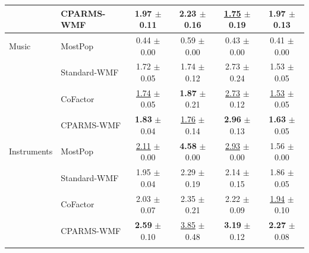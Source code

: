 \documentclass[pdflatex,sn-vancouver-num]{sn-jnl}%
\theoremstyle{thmstyleone}%
\theoremstyle{thmstyletwo}%
\theoremstyle{thmstylethree}%
\begin{document}
\begin{table}
\begin{tabular*}{\textheight}{@{\extracolsep{\fill}}llcccc@{}}
              & CPARMS-WMF & \textbf{1.97} $\pm$ 0.11 & \textbf{2.23} $\pm$ 0.16 & \underline{1.75} $\pm$ 0.19 & \textbf{1.97} $\pm$ 0.13 \\
\midrule
Music         & MostPop & 0.44 $\pm$ 0.00 & 0.59 $\pm$ 0.00 & 0.43 $\pm$ 0.00 & 0.41 $\pm$ 0.00 \\
              & Standard-WMF & 1.72 $\pm$ 0.05 & 1.74 $\pm$ 0.12 & 2.73 $\pm$ 0.24 & 1.53 $\pm$ 0.05 \\
              & CoFactor & \underline{1.74} $\pm$ 0.05 & \textbf{1.87} $\pm$ 0.21 & \underline{2.73} $\pm$ 0.12 & \underline{1.53} $\pm$ 0.05 \\
              & CPARMS-WMF & \textbf{1.83} $\pm$ 0.04 & \underline{1.76} $\pm$ 0.14 & \textbf{2.96} $\pm$ 0.13 & \textbf{1.63} $\pm$ 0.05 \\
\midrule
Instruments   & MostPop & \underline{2.11} $\pm$ 0.00 & \textbf{4.58} $\pm$ 0.00 & \underline{2.93} $\pm$ 0.00 & 1.56 $\pm$ 0.00 \\
              & Standard-WMF & 1.95 $\pm$ 0.04 & 2.29 $\pm$ 0.19 & 2.14 $\pm$ 0.15 & 1.86 $\pm$ 0.05 \\
              & CoFactor & 2.03 $\pm$ 0.07 & 2.35 $\pm$ 0.21 & 2.22 $\pm$ 0.09 & \underline{1.94} $\pm$ 0.10 \\
              & CPARMS-WMF & \textbf{2.59} $\pm$ 0.10 & \underline{3.85} $\pm$ 0.48 & \textbf{3.19} $\pm$ 0.12 & \textbf{2.27} $\pm$ 0.08 \\
\botrule
\end{tabular*}
\end{table}
\end{document}
